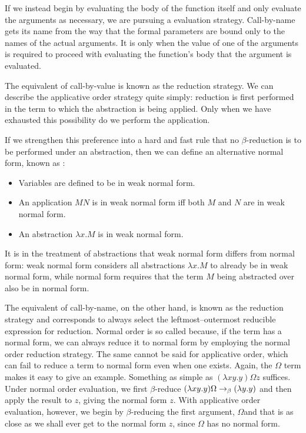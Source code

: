 If we instead begin by evaluating the body of the function itself and only evaluate the arguments as necessary, we are pursuing a  evaluation strategy. Call-by-name gets its name from the way that the formal parameters are bound only to the names of the actual arguments. It is only when the value of one of the arguments is required to proceed with evaluating the function's body that the argument is evaluated.

The \lambdacalc equivalent of call-by-value is known as the  reduction strategy. We can describe the applicative order strategy quite simply: reduction is first performed in the term to which the abstraction is being applied. Only when we have exhausted this possibility do we perform the application.

If we strengthen this preference into a hard and fast rule that no $\beta$-reduction is to be performed under an abstraction, then we can define an alternative normal form, known as :
\begin{itemize}
\item Variables are defined to be in weak normal form.
\item An application $MN$ is in weak normal form iff both $M$ and $N$ are in weak normal form.
\item An abstraction $\lambda x . M$ is in weak normal form.
\end{itemize}
It is in the treatment of abstractions that weak normal form differs from normal form: weak normal form considers all abstractions $\lambda x . M$ to already be in weak normal form, while normal form requires that the term $M$ being abstracted over also be in normal form.

The \lambdacalc equivalent of call-by-name, on the other hand, is known as the  reduction strategy and corresponds to always select the leftmost--outermost reducible expression for reduction. Normal order is so called because, if the term has a normal form, we can always reduce it to normal form by employing the normal order reduction strategy. The same cannot be said for applicative order, which can fail to reduce a term to normal form even when one exists. Again, the $\Omega$ term makes it easy to give an example. Something as simple as $(\lambda x y. y) \Omega z$ suffices. Under normal order evaluation, we first $\beta$-reduce $(\lambda x y. y) \Omega \betared (\lambda y. y)$ and then apply the result to $z$, giving the normal form $z$. With applicative order evaluation, however, we begin by $\beta$-reducing the first argument, $\Omega$\empause and that is as close as we shall ever get to the normal form $z$, since $\Omega$ has no normal form.

